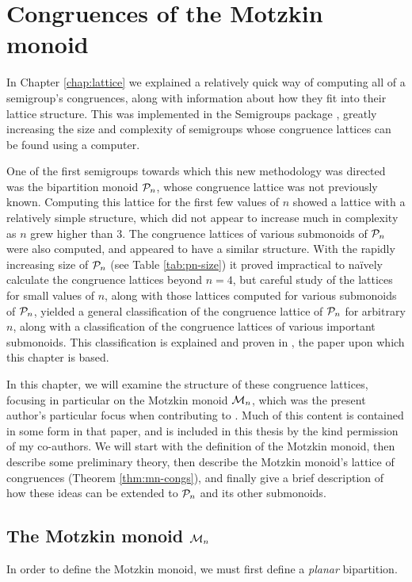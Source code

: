 \chapter{Congruences of the Motzkin monoid}
\label{chap:motzkin}

In Chapter \ref{chap:lattice} we explained a relatively quick way of computing
all of a semigroup's congruences, along with information about how they fit into
their lattice structure.  This was implemented in the Semigroups package
\cite{semigroups}, greatly increasing the size and complexity of semigroups
whose congruence lattices can be found using a computer.

One of the first semigroups towards which this new methodology was directed was
the bipartition monoid $\mathcal{P}_n$, whose congruence lattice was not previously
known.  Computing this lattice for the first few values of $n$ showed a lattice
with a relatively simple structure, which did not appear to increase much in
complexity as $n$ grew higher than $3$.  The congruence lattices of various
submonoids of $\mathcal{P}_n$ were also computed, and appeared to have a similar
structure.  With the rapidly increasing size of $\mathcal{P}_n$ (see Table
\ref{tab:pn-size}) it proved impractical to na\"ively calculate the congruence
lattices beyond $n=4$, but careful study of the lattices for small values of
$n$, along with those lattices computed for various submonoids of $\mathcal{P}_n$,
yielded a general classification of the congruence lattice of $\mathcal{P}_n$ for
arbitrary $n$, along with a classification of the congruence lattices of various
important submonoids.  This classification is explained and proven in
\cite{ourpaper}, the paper upon which this chapter is based.

In this chapter, we will examine the structure of these congruence lattices,
focusing in particular on the Motzkin monoid $\mathcal{M}_n$, which was the present
author's particular focus when contributing to \cite{ourpaper}.  Much of this
content is contained in some form in that paper, and is included in this thesis
by the kind permission of my co-authors.  We will start with the definition of
the Motzkin monoid, then describe some preliminary theory, then describe the
Motzkin monoid's lattice of congruences (Theorem \ref{thm:mn-congs}), and
finally give a brief description of how these ideas can be extended to $\mathcal{P}_n$
and its other submonoids.

\section{The Motzkin monoid $\mathcal{M}_n$}
\label{sec:motzkin-monoid}
In order to define the Motzkin monoid, we must first define a \textit{planar}
bipartition.

